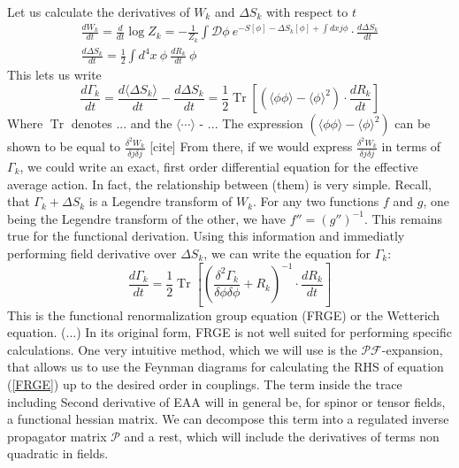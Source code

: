 \documentclass[11pt, a4paper]{article}
\begin{document}
Let us calculate the derivatives of $W_k$ and $\Delta S_k$ with respect to $t$
\begin{gather}
    \frac{d W_k}{dt} = \frac{d}{dt}\log{Z_k} = - \frac{1}{Z_k} \int \mathcal{D}\phi \ e^{-S[\phi] - \Delta S_k[\phi] + \int dx j \phi}  \cdot \frac{d \Delta S_k}{dt} \\
    \frac{d \Delta S_k}{dt} = \frac{1}{2} \int d^4 x \ \phi \ \frac{d R_k}{dt} \ \phi
\end{gather}
This lets us write
\begin{equation}
    \frac{d \Gamma_k}{dt} = \frac{d \langle \Delta S_k \rangle}{dt} - \frac{d \Delta S_k }{dt} = \frac{1}{2} \operatorname{Tr} \left[ (\langle\phi\phi\rangle - \langle\phi\rangle^2) \cdot \frac{d R_k}{dt} \right]
\end{equation}
Where $\operatorname{Tr}$ denotes ... and the $\langle\cdots\rangle$ - ...
The expression $(\langle\phi\phi\rangle - \langle\phi\rangle^2)$ can be shown to be equal to $\frac{\delta^2 W_k}{\delta j \delta j}$ [cite]
From there, if we would express $\frac{\delta^2 W_k}{\delta j \delta j}$ in terms of $\Gamma_k$, we could
write an exact, first order differential equation for the effective average action.
In fact, the relationship between (them) is very simple. Recall, that $\Gamma_k + \Delta S_k$ is a Legendre transform of $W_k$. For any
two functions $f$ and $g$, one being the Legendre transform of the other, we have $f'' = (g'')^{-1}$. This remains true for the functional derivation.
Using this information and immediatly performing field derivative over $\Delta S_k$, we can write the equation for $\Gamma_k$:
\begin{equation}
    \frac{d \Gamma_k}{dt} = \frac{1}{2} \operatorname{Tr} \left[ \left(\frac{\delta^2 \Gamma_k}{\delta \phi \delta \phi} + R_k\right)^{-1} \cdot \frac{d R_k}{dt} \right]
    \label{FRGE}
\end{equation}
This is the functional renormalization group equation (FRGE) or the Wetterich equation. (...)
In its original form, FRGE is not well suited for performing specific calculations. One very intuitive method, which
we will use is the $\mathcal{PF}$-expansion, that allows us to use the Feynman diagrams for calculating the RHS of equation (\ref{FRGE})
up to the desired order in couplings. The term inside the trace including Second derivative of EAA
will in general be, for spinor or tensor fields, a functional hessian matrix. We can decompose this term into a
regulated inverse propagator matrix $\mathcal{P}$ and a rest, which will include the derivatives of terms non quadratic in fields.
\end{document}
